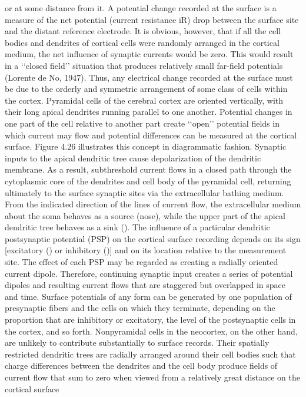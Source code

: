 or at some distance from it. A potential change recorded at the surface is a
measure of the net potential (current resistance iR) drop between the surface
site and the distant reference electrode. It is obvious, however, that if all the
cell bodies and dendrites of cortical cells were randomly arranged in the
cortical medium, the net influence of synaptic currents would be zero. This
would result in a ‘‘closed field’’ situation that produces relatively small far-field
potentials (Lorente de No, 1947). Thus, any electrical change recorded at the
surface must be due to the orderly and symmetric arrangement of some class of
cells within the cortex.
Pyramidal cells of the cerebral cortex are oriented vertically, with their
long apical dendrites running parallel to one another. Potential changes in one
part of the cell relative to another part create ‘‘open’’ potential fields in which
current may flow and potential differences can be measured at the cortical
surface. Figure 4.26 illustrates this concept in diagrammatic fashion. Synaptic
inputs to the apical dendritic tree cause depolarization of the dendritic
membrane. As a result, subthreshold current flows in a closed path through
the cytoplasmic core of the dendrites and cell body of the pyramidal cell,
returning ultimately to the surface synaptic sites via the extracellular bathing
medium. From the indicated direction of the lines of current flow, the
extracellular medium about the soma behaves as a source (nose), while the
upper part of the apical dendritic tree behaves as a sink ().
The influence of a particular dendritic postsynaptic potential (PSP) on the
cortical surface recording depends on its sign [excitatory () or inhibitory ()]
and on its location relative to the measurement site. The effect of each PSP
may be regarded as creating a radially oriented current dipole. Therefore,
continuing synaptic input creates a series of potential dipoles and resulting
current flows that are staggered but overlapped in space and time. Surface
potentials of any form can be generated by one population of presynaptic fibers
and the cells on which they terminate, depending on the proportion that are
inhibitory or excitatory, the level of the postsynaptic cells in the cortex, and so
forth.
Nonpyramidal cells in the neocortex, on the other hand, are unlikely to
contribute substantially to surface records. Their spatially restricted dendritic
trees are radially arranged around their cell bodies such that charge differences
between the dendrites and the cell body produce fields of current flow that sum
to zero when viewed from a relatively great distance on the cortical surface
